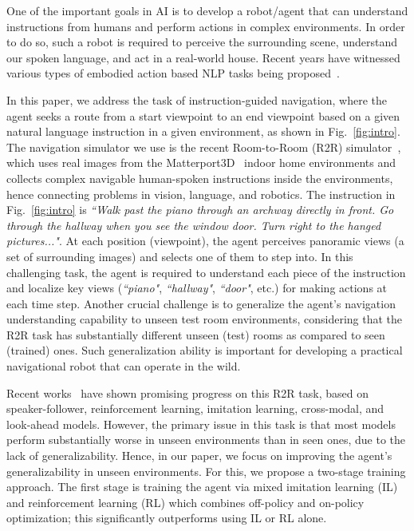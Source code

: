 \documentclass[11pt,a4paper]{article}
\begin{document}
One of the important goals in AI is to develop a robot/agent that can understand instructions from humans and perform actions in complex environments. 
In order to do so, such a robot is required to perceive the surrounding scene, understand our spoken language, and act in a real-world house. 
Recent years have witnessed various types of embodied action based NLP tasks being proposed~\cite{correa2010multimodal,walters2007robotic,hayashi2007humanoid, zhu2017target,das2018embodied,mattersim}.

In this paper, we address the task of instruction-guided navigation, where the agent seeks a route from a start viewpoint to an end viewpoint based on a given natural language instruction in a given environment, as shown in Fig.~\ref{fig:intro}.
The navigation simulator we use is the recent Room-to-Room (R2R) simulator~\cite{mattersim}, which uses real images from the Matterport3D~\cite{Matterport3D} indoor home environments and collects complex navigable human-spoken instructions inside the environments, hence connecting problems in vision, language, and robotics.
The instruction in Fig.~\ref{fig:intro} is \emph{``Walk past the piano through an archway directly in front. Go through the hallway when you see the window door. Turn right to the hanged pictures..."}.
At each position (viewpoint), the agent perceives panoramic views (a set of surrounding images) and selects one of them to step into.
In this challenging task, the agent is required to understand each piece of the instruction and localize key views (\emph{``piano"}, \emph{``hallway"}, \emph{``door"}, etc.) for making actions at each time step.
Another crucial challenge is to generalize the agent's navigation understanding capability to unseen test room environments, considering that the R2R task has substantially different unseen (test) rooms as compared to seen (trained) ones.
Such generalization ability is important for developing a practical navigational robot that can operate in the wild.

Recent works~\cite{fried2018speaker, wang2018reinforced,wang2018look,anonymous2019self-aware} have shown promising progress on this R2R task, based on speaker-follower, reinforcement learning, imitation learning, cross-modal, and look-ahead models.
However, the primary issue in this task is that most models perform substantially worse in unseen environments than in seen ones, due to the lack of generalizability.
Hence, in our paper, we focus on improving the agent's generalizability in unseen environments.
For this, we propose a two-stage training approach.
The first stage is training the agent via mixed imitation learning (IL) and reinforcement learning (RL) which combines off-policy and on-policy optimization; this significantly outperforms using IL or RL alone.
\end{document}

